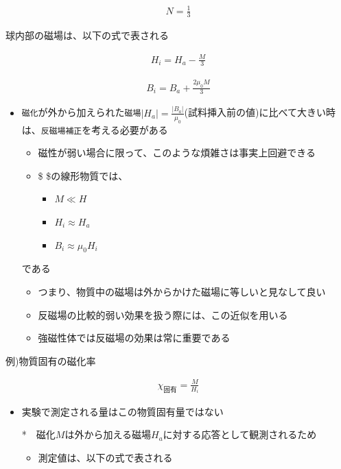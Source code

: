 \documentclass[11pt]{article}
\providecommand{\tightlist}{%
      \setlength{\itemsep}{0pt}\setlength{\parskip}{0pt}}
\begin{document}
\begin{eqnarray}
N = \frac{1}{3}
\end{eqnarray}

球内部の磁場は、以下の式で表される

\begin{eqnarray}
H_i = H_a - \frac{M}{3}
\end{eqnarray}

\begin{eqnarray}
B_i = B_a + \frac{2 \mu_0 M}{3}
\end{eqnarray}

    \begin{itemize}
\item
  \texttt{磁化}が外から加えられた\texttt{磁場}\(|H_a| = \frac{|B_a|}{\mu_0}\)(試料挿入前の値)に比べて大きい時は、\texttt{反磁場補正}を考える必要がある

  \begin{itemize}
  \item
    磁性が弱い場合に限って、このような煩雑さは事実上回避できる
  \item
    \$ \chi {}\$の線形物質では、

    \begin{itemize}
    \item
      \(M \ll H\)
    \item
      \(H_i \approx H_a\)
    \item
      \(B_i \approx \mu_0 H_i\)
    \end{itemize}
  \end{itemize}

  である

  \begin{itemize}
  \item
    つまり、物質中の磁場は外からかけた磁場に等しいと見なして良い
  \item
    反磁場の比較的弱い効果を扱う際には、この近似を用いる
  \item
    強磁性体では反磁場の効果は常に重要である
  \end{itemize}
\end{itemize}

    例)物質固有の磁化率

\begin{eqnarray}
\chi_{固有} = \frac{M}{H_i}
\end{eqnarray}

\begin{itemize}
\item
  実験で測定される量はこの物質固有量ではない

  *　磁化\(M\)は外から加える磁場\(H_a\)に対する応答として観測されるため

  \begin{itemize}
  \tightlist
  \item
    測定値は、以下の式で表される
  \end{itemize}
\end{itemize}
\end{document}
